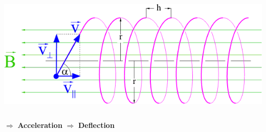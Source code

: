 \documentclass[10pt,t]{beamer}
\begin{document}
\begin{frame}
\begin{columns}
    \includegraphics[width=\textwidth]{beschleuniger-lorentzkraft-spirale}
\end{columns}
\vspace*{1em}
\begin{columns}
\centering$\boldsymbol{\Rightarrow}$ \textbf{Acceleration}
\centering$\boldsymbol{\Rightarrow}$ \textbf{Deflection}
\end{columns}
\end{frame}
\end{document}
